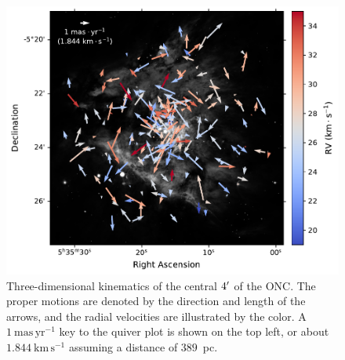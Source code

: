\documentclass[12pt]{ucsddissertation}
\begin{document}
\begin{CJK*}{UTF8}{gbsn}
\begin{figure}[htb!]
    \centering
    \includegraphics[width=0.8\linewidth]{figures/chapter1/3D_kinematics.pdf}
    \caption[Three-dimensional kinematics of the central ONC]{Three-dimensional kinematics of the central $4\mbox{$^\prime$}$ of the ONC. The proper motions are denoted by the direction and length of the arrows, and the radial velocities are illustrated by the color. A $1~\mathrm{mas}\,\mathrm{yr}^{-1}$ key to the quiver plot is shown on the top left, or about $1.844~\mathrm{km}\,\mathrm{s}^{-1}$ assuming a distance of $389$~pc.}
    \label{fig:3d kinematics}
\end{figure}


\end{CJK*}
\end{document}
